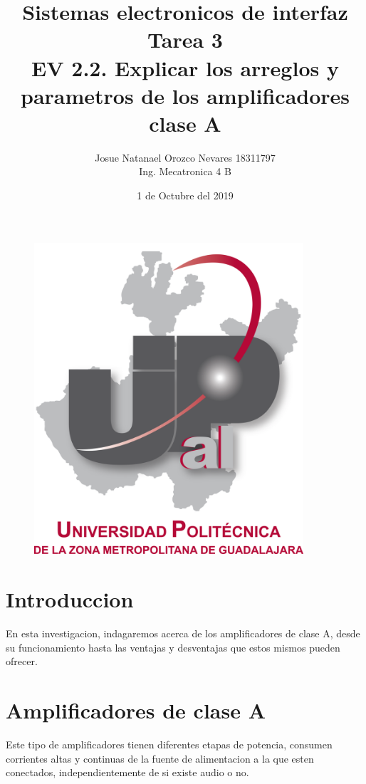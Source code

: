 \documentclass[12pt,a4paper]{article}
\begin{document}
\title{\textbf{Sistemas electronicos de interfaz \\ Tarea 3 \\ EV 2.2. Explicar los arreglos y parametros de los amplificadores clase A}}

\author{Josue Natanael Orozco Nevares 18311797 \\ Ing. Mecatronica 4 B}
\date{1 de Octubre del 2019}
\maketitle

\begin{figure}[h!]
\centering
\includegraphics[width=10cm]{UPCDLZMDG5783-logo.png} 
\end{figure}

\newpage

\section{Introduccion}
En esta investigacion, indagaremos acerca de los amplificadores de clase A, desde su funcionamiento hasta las ventajas y desventajas que estos mismos pueden ofrecer.

\section{Amplificadores de clase A}
Este tipo de amplificadores tienen diferentes etapas de potencia, consumen corrientes altas y continuas de la fuente de alimentacion a la que esten conectados, independientemente de si existe audio o no.
\end{document}
